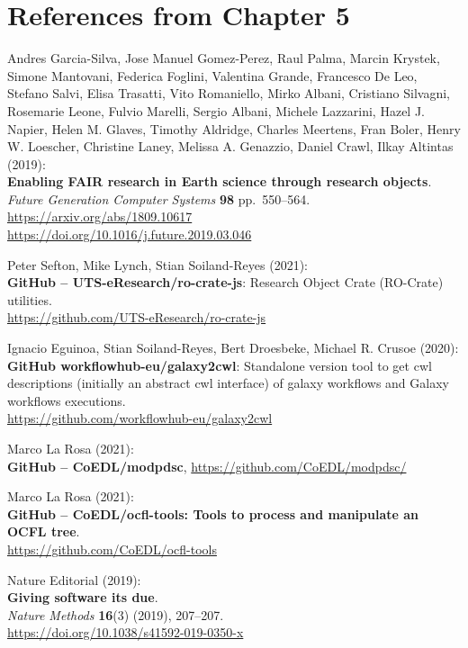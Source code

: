 \section{References from Chapter 5}


Andres Garcia-Silva, Jose Manuel Gomez-Perez, Raul Palma,
Marcin Krystek, Simone Mantovani, Federica Foglini, Valentina Grande,
Francesco De Leo, Stefano Salvi, Elisa Trasatti, Vito Romaniello, Mirko
Albani, Cristiano Silvagni, Rosemarie Leone, Fulvio Marelli, Sergio
Albani, Michele Lazzarini, Hazel J. Napier, Helen M. Glaves, Timothy
Aldridge, Charles Meertens, Fran Boler, Henry W. Loescher, Christine
Laney, Melissa A. Genazzio, Daniel Crawl, Ilkay Altintas (2019):\\
\textbf{Enabling FAIR research in Earth science through research
objects}.\\
\emph{Future Generation Computer Systems} \textbf{98} pp.~550--564.\\
\url{https://arxiv.org/abs/1809.10617}\\
\url{https://doi.org/10.1016/j.future.2019.03.046}

Peter Sefton, Mike Lynch, Stian Soiland-Reyes (2021):\\
\textbf{GitHub -- UTS-eResearch/ro-crate-js}: Research Object Crate
(RO-Crate) utilities.\\
\url{https://github.com/UTS-eResearch/ro-crate-js}

Ignacio Eguinoa, Stian Soiland-Reyes, Bert Droesbeke, Michael
R. Crusoe (2020):\\
\textbf{GitHub workflowhub-eu/galaxy2cwl}: Standalone version tool to
get cwl descriptions (initially an abstract cwl interface) of galaxy
workflows and Galaxy workflows executions.\\
\url{https://github.com/workflowhub-eu/galaxy2cwl}

Marco La Rosa (2021):\\
\textbf{GitHub -- CoEDL/modpdsc},
\url{https://github.com/CoEDL/modpdsc/}

Marco La Rosa (2021):\\
\textbf{GitHub -- CoEDL/ocfl-tools: Tools to process and manipulate an OCFL tree}.\\
\url{https://github.com/CoEDL/ocfl-tools}

Nature Editorial (2019):\\
\textbf{Giving software its due}.\\
\emph{Nature Methods} \textbf{16}(3) (2019), 207--207.\\
\url{https://doi.org/10.1038/s41592-019-0350-x}

